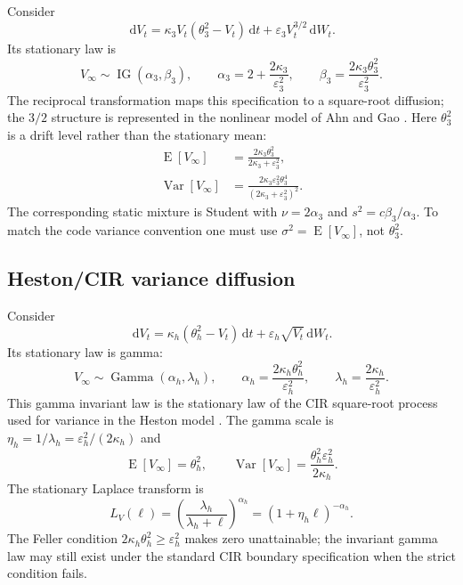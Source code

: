\documentclass[11pt,a4paper]{article}
\DeclareMathOperator{\IG}{IG}
\DeclareMathOperator{\GammaDist}{Gamma}
\DeclareMathOperator{\Var}{Var}
\DeclareMathOperator{\E}{E}
\newcommand{\dd}{\,\mathrm{d}}
\begin{document}
Consider
\begin{equation}
  \dd V_t=\kappa_3V_t(\theta_3^2-V_t)\dd t
  +\varepsilon_3V_t^{3/2}\dd W_t.
  \label{eq:three_halves_variance}
\end{equation}
Its stationary law is
\begin{equation}
  V_\infty\sim\IG(\alpha_3,\beta_3),\qquad
  \alpha_3=2+\frac{2\kappa_3}{\varepsilon_3^2},\qquad
  \beta_3=\frac{2\kappa_3\theta_3^2}{\varepsilon_3^2}.
  \label{eq:three_halves_stationary}
\end{equation}
The reciprocal transformation maps this specification to a square-root
diffusion; the $3/2$ structure is represented in the nonlinear model of Ahn
and Gao \cite{AhnGao1999}.
Here $\theta_3^2$ is a drift level rather than the stationary mean:
\begin{align}
  \E[V_\infty]
  &=\frac{2\kappa_3\theta_3^2}{2\kappa_3+\varepsilon_3^2},
  \label{eq:three_halves_mean}
  \\
  \Var[V_\infty]
  &=\frac{2\kappa_3\varepsilon_3^2\theta_3^4}
  {(2\kappa_3+\varepsilon_3^2)^2}.
  \label{eq:three_halves_stationary_variance}
\end{align}
The corresponding static mixture is Student with $\nu=2\alpha_3$ and
$s^2=c\beta_3/\alpha_3$.  To match the code variance convention one must use
$\sigma^2=\E[V_\infty]$, not $\theta_3^2$.

\subsection{Heston/CIR variance diffusion}

Consider
\begin{equation}
  \dd V_t=\kappa_h(\theta_h^2-V_t)\dd t
  +\varepsilon_h\sqrt{V_t}\dd W_t.
  \label{eq:heston_variance}
\end{equation}
Its stationary law is gamma:
\begin{equation}
  V_\infty\sim\GammaDist(\alpha_h,\lambda_h),\qquad
  \alpha_h=\frac{2\kappa_h\theta_h^2}{\varepsilon_h^2},\qquad
  \lambda_h=\frac{2\kappa_h}{\varepsilon_h^2}.
  \label{eq:heston_stationary}
\end{equation}
This gamma invariant law is the stationary law of the CIR square-root process
\cite{CIR1985} used for variance in the Heston model \cite{Heston1993}.
The gamma scale is $\eta_h=1/\lambda_h=\varepsilon_h^2/(2\kappa_h)$ and
\begin{equation}
  \E[V_\infty]=\theta_h^2,
  \qquad
  \Var[V_\infty]
  =\frac{\theta_h^2\varepsilon_h^2}{2\kappa_h}.
  \label{eq:heston_stationary_moments}
\end{equation}
The stationary Laplace transform is
\begin{equation}
  L_V(\ell)=\left(\frac{\lambda_h}{\lambda_h+\ell}\right)^{\alpha_h}
  =(1+\eta_h\ell)^{-\alpha_h}.
  \label{eq:heston_laplace}
\end{equation}
The Feller condition $2\kappa_h\theta_h^2\ge\varepsilon_h^2$ makes zero
unattainable; the invariant gamma law may still exist under the standard CIR
boundary specification when the strict condition fails.
\end{document}
